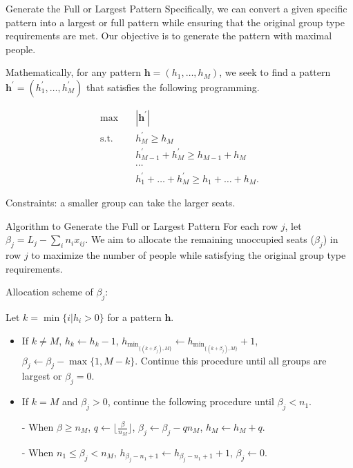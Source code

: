   \begin{frame}{Generate the Full or Largest Pattern}
    Specifically, we can convert a given specific pattern into a largest or full pattern while ensuring that the original group type requirements are met. Our objective is to generate the pattern with maximal people.

    Mathematically, for any pattern $\bm{h} = (h_1, \ldots, h_M)$, we seek to find a pattern $\bm{h}^{'} = (h_1^{'}, \ldots, h_M^{'})$ that satisfies the following programming.

    \begin{equation*}\label{full_largest}
      \begin{aligned}
      \max \quad & |\bm{h}^{'}| \\
      \text {s.t.} \quad & h_M^{'} \geq h_M \\
      &  h_{M-1}^{'} + h_M^{'} \geq h_{M-1} + h_M \\
      & \cdots \\
      & h_1^{'} + \ldots + h_M^{'} \geq h_1 + \ldots + h_M.
      \end{aligned}
    \end{equation*}

    Constraints: a smaller group can take the larger seats.
  \end{frame}

  \begin{frame}{Algorithm to Generate the Full or Largest Pattern}
    For each row $j$, let $\beta_{j} = L_{j} - \sum_{i} n_{i} x_{ij}$. We aim to allocate the remaining unoccupied seats ($\beta_{j}$) in row $j$ to maximize the number of people while satisfying the original group type requirements.
    \vspace{0.5cm}
    
    Allocation scheme of $\beta_{j}$:
    \vspace{0.5cm}

    \begin{scriptsize}
      Let $k = \min\{i | h_i > 0\}$ for a pattern $\bm{h}$.

      \begin{itemize}
        \item If $k \neq M$, $h_{k} \gets h_{k} -1$, $h_{\min_{\{(k+\beta_{j}), M\}}} \gets h_{\min_{\{(k+\beta_{j}), M\}}} +1$, $\beta_{j} \gets \beta_{j} - \max\{1, M - k\}$. Continue this procedure until all groups are largest or $\beta_{j} =0$. 
        \item If $k = M$ and $\beta_{j} > 0$, continue the following procedure until $\beta_{j} < n_{1}$.
        \item[-] When $\beta \geq n_{M}$, $q \gets \lfloor\frac{\beta}{n_M}\rfloor$, $\beta_{j} \gets \beta_{j} - q n_M$, $h_{M} \gets h_{M} + q$.
        \item[-] When $n_{1} \leq \beta_{j} < n_{M}$, $h_{\beta_{j}-n_1+1} \gets h_{\beta_{j}-n_1+1} + 1$, $\beta_{j} \gets 0$.
      \end{itemize}  
    \end{scriptsize}
    
  \end{frame}